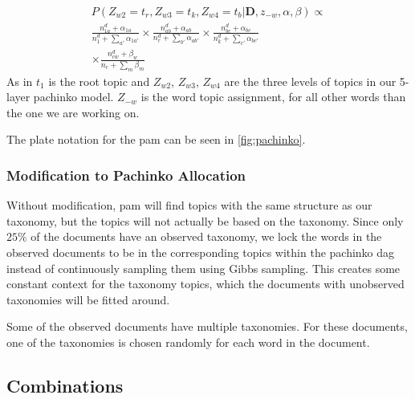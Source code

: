 \begin{equation}\label{eq:pachinko_gibbs}
	\begin{split}
		P(Z_{w2} = t_r, Z_{w3} = t_k, Z_{w4} = t_b | \textbf{D}, z_{-w}, \alpha, \beta) \propto \\
		\frac{n_{1a}^d + \alpha_{1a}}{n_1^d + \sum_{a'} \alpha_{1a'}} \times
		\frac{n_{ab}^d + \alpha_{ab}}{n_r^d + \sum_{b'} \alpha_{ab'}}  \times 
		\frac{n_{bc}^d + \alpha_{bc}}{n_{k}^d + \sum_{c'} \alpha_{bc'}} \\ \times 
		\frac{n_{cw}^d + \beta_{w}}{n_{c} + \sum_{m} \beta_{m}} 
	\end{split}
\end{equation}
As in \citet{li2006pachinko} $t_1$ is the root topic and $Z_{w2}$, $Z_{w3}$, $Z_{w4}$ are the three levels of topics in our 5-layer pachinko model. 
$Z_{-w}$ is the word topic assignment, for all other words than the one we are working on.


The plate notation for the \gls{pam} can be seen in \autoref{fig:pachinko}.





\subsubsection{Modification to Pachinko Allocation}
Without modification, \gls{pam} will find topics with the same structure as our taxonomy, but the topics will not actually be based on the taxonomy.
Since only $25\%$ of the documents have an observed taxonomy, we lock the words in the observed documents to be in the corresponding topics within the pachinko \gls{dag} instead of continuously sampling them using Gibbs sampling.
This creates some constant context for the taxonomy topics, which the documents with unobserved taxonomies will be fitted around.

Some of the observed documents have multiple taxonomies.
For these documents, one of the taxonomies is chosen randomly for each word in the document.

\subsection{Combinations}
